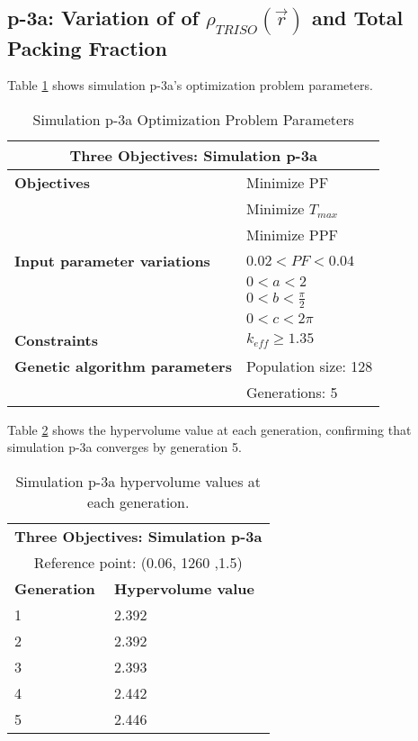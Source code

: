 \subsection{p-3a: Variation of of $\rho_{TRISO}(\vec{r})$ and Total Packing Fraction}
\label{sec:p-3a}
Table \ref{tab:simulationp3a} shows simulation p-3a's optimization problem parameters. 
\begin{table}[htbp!]
    \centering
    \onehalfspacing
    \caption{Simulation p-3a Optimization Problem Parameters}
	\label{tab:simulationp3a}
    \footnotesize
    \begin{tabular}{l|p{4cm}}
    \hline 
    \multicolumn{2}{c}{\textbf{Three Objectives: Simulation p-3a}} \\
    \hline 
    \textbf{Objectives} & Minimize PF \\
    & Minimize $T_{max}$ \\
    & Minimize PPF \\
    \hline 
    \textbf{Input parameter variations} & $0.02<PF<0.04$ \\
    & $0<a<2$ \\
    & $0<b<\frac{\pi}{2}$ \\
    & $0<c<2\pi$ \\
    \hline
    \textbf{Constraints} & $k_{eff} \geq 1.35$\\ 
    \hline 
    \textbf{Genetic algorithm parameters} & Population size: 128 \\
    & Generations: 5 \\
    \hline
    \end{tabular}
\end{table}

Table \ref{tab:p3a-hypervolume} shows the hypervolume value at each generation, 
confirming that simulation p-3a converges by generation 5. 
\begin{table}[htbp!]
    \centering
    \onehalfspacing
    \caption{Simulation p-3a hypervolume values at each generation.}
	\label{tab:p3a-hypervolume}
    \footnotesize
    \begin{tabular}{ll}
    \hline 
    \multicolumn{2}{c}{\textbf{Three Objectives: Simulation p-3a}} \\
    \multicolumn{2}{c}{Reference point: (0.06, 1260 ,1.5)} \\
    \hline 
    \textbf{Generation} & \textbf{Hypervolume value} \\
    \hline
    1 & 2.392 \\
    2 & 2.392 \\
    3 & 2.393 \\
    4 & 2.442 \\
    5 & 2.446 \\
    \hline
    \end{tabular}
\end{table}

